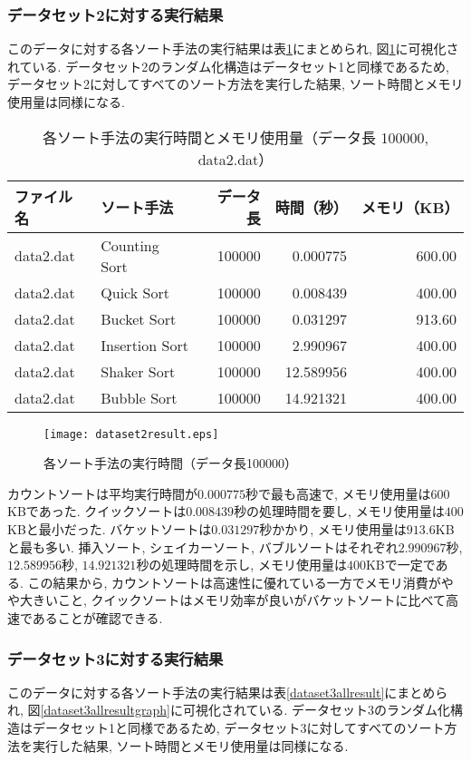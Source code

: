 \documentclass[a4j, 11pt]{jarticle}
\begin{document}
\subsubsection{データセット2に対する実行結果}
このデータに対する各ソート手法の実行結果は表\ref{dataset2allresult}にまとめられ, 図\ref{dataset2allresultgraph}に可視化されている. データセット2のランダム化構造はデータセット1と同様であるため, データセット2に対してすべてのソート方法を実行した結果, ソート時間とメモリ使用量は同様になる. \
\begin{table}[H]
  \centering
  \caption{各ソート手法の実行時間とメモリ使用量（データ長 100000, data2.dat）}\label{dataset2allresult}
  \begin{tabular}{|l|l|r|r|r|}
    \hline
    \textbf{ファイル名} & \textbf{ソート手法} & \textbf{データ長} & \textbf{時間（秒）} & \textbf{メモリ（KB）} \\
    \hline
    data2.dat & Counting Sort  & 100000 & 0.000775  & 600.00 \\
    data2.dat & Quick Sort     & 100000 & 0.008439  & 400.00 \\
    data2.dat & Bucket Sort    & 100000 & 0.031297  & 913.60 \\
    data2.dat & Insertion Sort & 100000 & 2.990967  & 400.00 \\
    data2.dat & Shaker Sort    & 100000 & 12.589956 & 400.00 \\
    data2.dat & Bubble Sort    & 100000 & 14.921321 & 400.00 \\
    \hline
  \end{tabular}
\end{table}

\begin{figure}[H]
  \centering
  \texttt{[image: dataset2result.eps]}
  \caption{各ソート手法の実行時間（データ長100000）}\label{dataset2allresultgraph}
\end{figure}
カウントソートは平均実行時間が$0.000775$秒で最も高速で, メモリ使用量は$600$KBであった. 
クイックソートは$0.008439$秒の処理時間を要し, メモリ使用量は$400$KBと最小だった. 
バケットソートは$0.031297$秒かかり, メモリ使用量は$913.6$KBと最も多い. 
挿入ソート, シェイカーソート, バブルソートはそれぞれ$2.990967$秒, $12.589956$秒, $14.921321$秒の処理時間を示し, メモリ使用量は$400$KBで一定である. 
この結果から, カウントソートは高速性に優れている一方でメモリ消費がやや大きいこと, クイックソートはメモリ効率が良いがバケットソートに比べて高速であることが確認できる. 
\subsubsection{データセット3に対する実行結果}
このデータに対する各ソート手法の実行結果は表\ref{dataset3allresult}にまとめられ, 図\ref{dataset3allresultgraph}に可視化されている. データセット3のランダム化構造はデータセット1と同様であるため, データセット3に対してすべてのソート方法を実行した結果, ソート時間とメモリ使用量は同様になる. \
\end{document}
